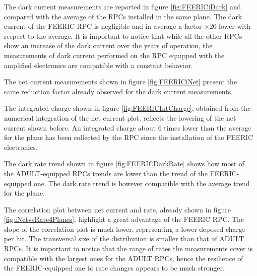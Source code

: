 The dark current measurements are reported in figure \ref{fig:FEERICiDark} and compared with the average of the RPCs installed in the same plane.
The dark current of the FEERIC RPC is negligible and in average a factor $\times20$ lower with respect to the average.
It is important to notice that while all the other RPCs show an increase of the dark current over the years of operation, the measurements of dark current performed on the RPC equipped with the amplified electronics are compatible with a constant behavior.

The net current measurements shown in figure \ref{fig:FEERICiNet} present the same reduction factor already observed for the dark current measurements.

The integrated charge shown in figure \ref{fig:FEERICIntCharge}, obtained from the numerical integration of the net current plot, reflects the lowering of the net current shown before.
An integrated charge about $6$ times lower than the average for the plane has been collected by the RPC since the installation of the FEERIC electronics.

The dark rate trend shown in figure \ref{fig:FEERICDarkRate} shows how most of the ADULT-equipped RPCs trends are lower than the trend of the FEERIC-equipped one.
The dark rate trend is however compatible with the average trend for the plane.

The correlation plot between net current and rate, already shown in figure \ref{fig:iNetvsRate4Planes}, highlight a great advantage of the FEERIC RPC.
The slope of the correlation plot is much lower, representing a lower deposed charge per hit.
The transversal size of the distribution is smaller than that of ADULT RPCs.
It is important to notice that the range of rates the measurements cover is compatible with the largest ones for the ADULT RPCs, hence the resilience of the FEERIC-equipped one to rate changes appears to be much stronger.






